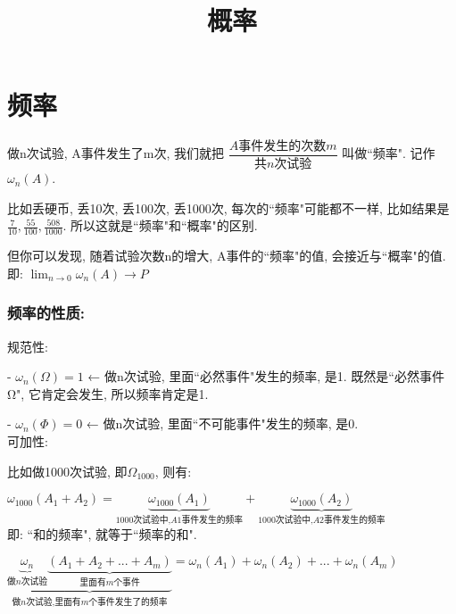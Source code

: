 \documentclass[UTF8]{ctexart}
\title{概率}
\begin{document}
	\tableofcontents %
	\date{} %
	\maketitle  %
	
	

\part{频率}

做n次试验, A事件发生了m次, 我们就把 $\dfrac{A\text{事件发生的次数}m}{\text{共}n\text{次试验}}$ 叫做``频率". 记作$\omega _n\left( A \right) $.

比如丢硬币, 丢10次, 丢100次, 丢1000次, 每次的``频率"可能都不一样, 比如结果是 $\frac{7}{10},\frac{55}{100},\frac{508}{1000} $. 所以这就是``频率"和``概率"的区别.

但你可以发现, 随着试验次数n的增大, A事件的``频率"的值, 会接近与``概率"的值. 即: $ \lim_{n→0}\omega _n\left( A \right)  \to P $


\section{频率的性质:}

规范性: 

- $\omega _n\left( \varOmega \right) =1$ ← 做n次试验, 里面``必然事件"发生的频率, 是1.  
既然是``必然事件Ω", 它肯定会发生, 所以频率肯定是1.


- $\omega _n\left( \varPhi \right) =0$ ← 做n次试验, 里面``不可能事件"发生的频率, 是0. \\



可加性: 


比如做1000次试验, 即$ \varOmega_{1000}$, 则有: 

$\omega _{1000}\left( A_1+A_2 \right) =\underset{1000\text{次试验中,}A1\text{事件发生的频率}}{\underbrace{\omega _{1000}\left( A_1 \right) }}+\underset{1000\text{次试验中,}A2\text{事件发生的频率}}{\underbrace{\omega _{1000}\left( A_2 \right) }}$ \\

即: ``和的频率", 就等于``频率的和".

$
\boxed{
\underset{\text{做}n\text{次试验,里面有}m\text{个事件发生了的频率}}{\underbrace{\underset{\text{做}n\text{次试验}}{\underbrace{\omega _n}}\underset{\text{里面有}m\text{个事件}}{\underbrace{\left( A_1+A_2+...+A_m \right) }}}}=\omega _n\left( A_1 \right) +\omega _n\left( A_2 \right) +...+\omega _n\left( A_m \right) 
}
$




	
\end{document}
